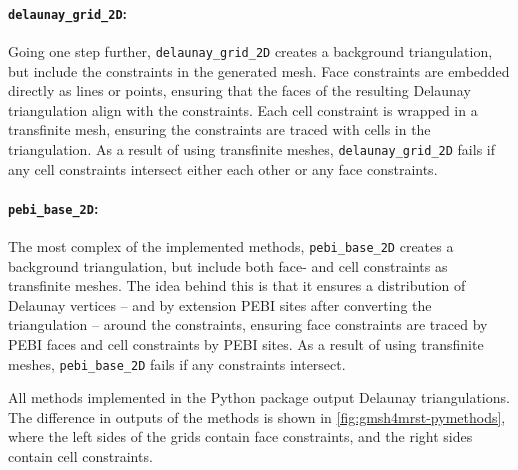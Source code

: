\paragraph{\texttt{delaunay\_grid\_2D}:}
Going one step further, \verb|delaunay_grid_2D| creates a background triangulation, but include the constraints in the generated mesh. Face constraints are embedded directly as lines or points, ensuring that the faces of the resulting Delaunay triangulation align with the constraints. Each cell constraint is wrapped in a transfinite mesh, ensuring the constraints are traced with cells in the triangulation. As a result of using transfinite meshes, \verb|delaunay_grid_2D| fails if any cell constraints intersect either each other or any face constraints.

\paragraph{\texttt{pebi\_base\_2D}:}
The most complex of the implemented methods, \verb|pebi_base_2D| creates a background triangulation, but include both face- and cell constraints as transfinite meshes. The idea behind this is that it ensures a distribution of Delaunay vertices -- and by extension PEBI sites after converting the triangulation -- around the constraints, ensuring face constraints are traced by PEBI faces and cell constraints by PEBI sites. As a result of using transfinite meshes, \verb|pebi_base_2D| fails if any constraints intersect.

All methods implemented in the Python package output Delaunay triangulations. The difference in outputs of the methods is shown in \autoref{fig:gmsh4mrst-pymethods}, where the left sides of the grids contain face constraints, and the right sides contain cell constraints.

